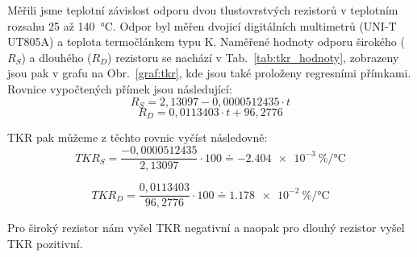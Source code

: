 Měřili jsme teplotní závislost odporu dvou tlustovrstvých rezistorů v teplotním rozsahu 25 až \qty{140}{\degreeCelsius}. Odpor byl měřen dvojicí digitálních multimetrů (UNI-T UT805A) a teplota termočlánkem typu K. Naměřené hodnoty odporu širokého (\(R_{S} \)) a dlouhého (\(R_{D } \)) rezistoru se nachází v Tab.~\ref{tab:tkr_hodnoty}, zobrazeny jsou pak v grafu na Obr.~\ref{graf:tkr}, kde jsou také proloženy regresními přímkami. Rovnice vypočtených přímek jsou následující:
\[
    R_{S} = 2,13097-0,0000512435\cdot t
\]
\[
    R_{D} = 0,0113403\cdot t +96,2776
\]

TKR pak můžeme z těchto rovnic vyčíst následovně:
\[
    TKR_{S} = \frac{-0,0000512435}{2,13097}\cdot 100 \doteq \qty{-2,404e-3}{\percent\per\degreeCelsius}
\]

\[
    TKR_{D} = \frac{0,0113403}{96,2776}\cdot 100 \doteq \qty{1,178e-2}{\percent\per\degreeCelsius}
\]

Pro široký rezistor nám vyšel TKR negativní a naopak pro dlouhý rezistor vyšel TKR pozitivní.

